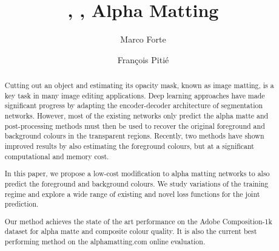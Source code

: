 \documentclass[runningheads]{llncs}
\begin{document}
\pagestyle{headings}
\mainmatter
\def\ECCVSubNumber{6826}  \def\XXX{\textcolor{red}{XXXX}}
\def\XXXX{\textcolor{red}{XXXX}}

\newcommand{\alphap}{\bm{\hat{\alpha}}}
\newcommand{\fp}{\mathbf{\hat{{F}}}}
\newcommand{\bp}{\mathbf{\hat{{B}}}}
\newcommand{\cgt}{\mathbf{C}}

\newcommand{\alphagt}{\bm{{\alpha}}}
\newcommand{\fgt}{\mathbf{{{F}}}}
\newcommand{\bgt}{\mathbf{{{B}}}}



\title{, , Alpha Matting } 





\author{Marco Forte \and
Fran\c{c}ois Piti\'e} 
\maketitle
\begin{abstract}
Cutting out an object and estimating its opacity mask, known as image matting, is a key task in many image editing applications. Deep learning approaches have made significant progress by adapting the encoder-decoder architecture of segmentation networks. However, most of the existing networks only predict the alpha matte and post-processing methods must then be used to recover the original foreground and background colours in the transparent regions. Recently, two methods have shown improved results by also estimating the foreground colours, but at a significant computational and memory cost.

In this paper, we propose a low-cost modification to alpha matting networks to also predict the foreground and background colours. We study variations of the training regime and explore a wide range of existing and novel loss functions for the joint prediction. 

Our method achieves the state of the art performance on the Adobe Composition-1k dataset for alpha matte and composite colour quality. It is also the current best performing method on the alphamatting.com online evaluation. 






\end{abstract}
\end{document}
